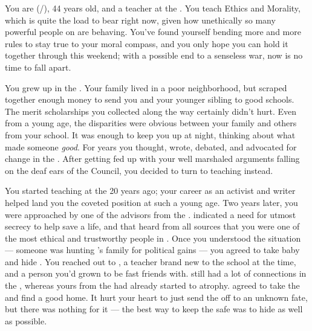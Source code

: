 \documentclass[char]{GL2020}
\begin{document}
\name{\cEthics{}}

You are \cEthics{\full} (\cEthics{\they}/\cEthics{\them}), 44 years old, and a teacher at the \pSchool{}. You teach Ethics and Morality, which is quite the load to bear right now, given how unethically so many powerful people on \pEarth{} are behaving. You've found yourself bending more and more rules to stay true to your moral compass, and you only hope you can hold it together through this weekend; with a possible end to a senseless war, now is no time to fall apart.

You grew up in the \pTech{}. Your family lived in a poor neighborhood, but scraped together enough money to send you and your younger sibling to good schools. The merit scholarships you collected along the way certainly didn't hurt. Even from a young age, the disparities were obvious between your family and others from your school. It was enough to keep you up at night, thinking about what made someone \emph{good}. For years you thought, wrote, debated, and advocated for change in the \pTech{}. After getting fed up with your well marshaled arguments falling on the deaf ears of the Council, you decided to turn to teaching instead.

You started teaching at the \pSc{} 20 years ago; your career as an activist and writer helped land you the coveted position at such a young age. Two years later, you were approached by one of the advisors from the \pFarm{}. \cEvil{\They} indicated a need for utmost secrecy to help save a life, and that \cEvil{\they} heard from all sources that you were one of the most ethical and trustworthy people in \pEarth{}. Once you understood the situation — someone was hunting \cEvil{\full}'s family for political gains — you agreed to take \cEvil{\their} baby \cPirateChild{\child} and hide \cPirateChild{\them}. You reached out to \cPirate{\full}, a teacher brand new to the school at the time, and a person you'd grown to be fast friends with. \cPirate{\They} still had a lot of connections in the \pShip{}, whereas yours from the \pTech{} had already started to atrophy. \cPirate{} agreed to take the \cPirateChild{\child} and find \cPirateChild{\them} a good home. It hurt your heart to just send the \cPirateChild{\child} off to an unknown fate, but there was nothing for it — the best way to keep the \cPirateChild{\child} safe was to hide \cPirateChild{\them} as well as possible.
\end{document}
